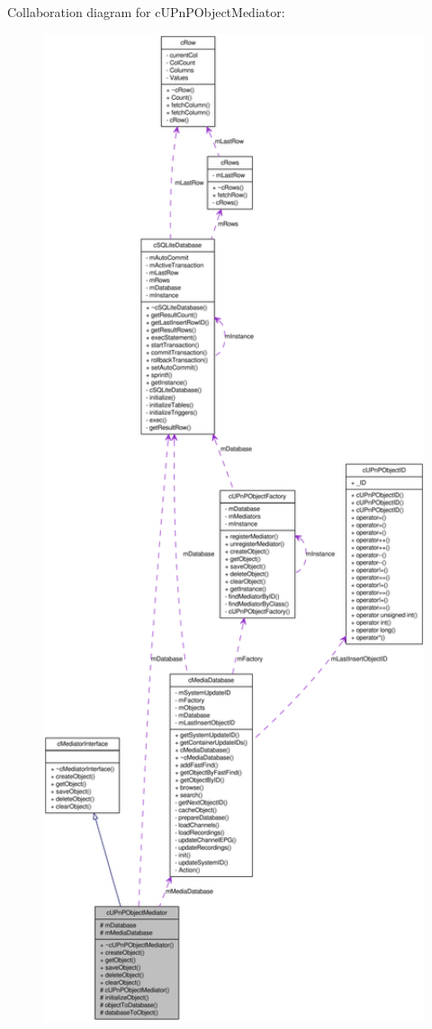 Collaboration diagram for cUPnPObjectMediator:\nopagebreak
\begin{figure}[H]
\begin{center}
\leavevmode
\includegraphics[width=400pt]{classcUPnPObjectMediator__coll__graph}
\end{center}
\end{figure}
